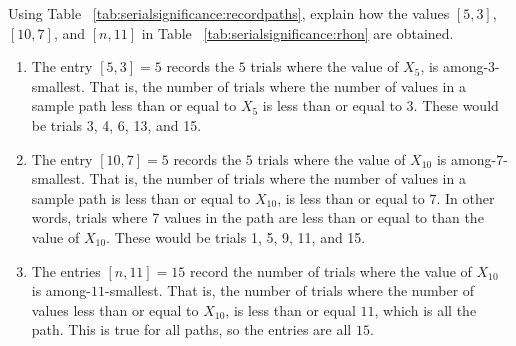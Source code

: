 \documentclass[12pt]{article}
\begin{document}
\begin{exercise}
    Using Table~%
    \ref{tab:serialsignificance:recordpaths}, explain how the values \(
    [5,3] \), \( [10, 7] \), and \( [n, 11] \) in  Table~%
    \ref{tab:serialsignificance:rhon}
    are obtained.
\end{exercise}
\begin{solution}
    \begin{enumerate}
        \item
            The entry \( [5,3] = 5 \) records the \( 5 \) trials where
            the value of \( X_5 \), is among-3-smallest.  That is, the
            number of trials where the number of values in a sample path
            less than or equal to \( X_5 \) is less
            than or equal to \( 3 \).  These would be trials 3, 4, 6,
            13, and 15.
        \item
            The entry \( [10, 7] = 5 \) records the \( 5 \) trials
            where the value of \( X_{10} \) is among-\( 7 \)-smallest.
            That is, the number of trials where the number of values
            in a sample path is less than or equal to \(
            X_{10} \), is less than or equal to \( 7 \).  In other words,
            trials where 7 values in the path are less than or
            equal to than the value of \( X_{10} \).  These would be
            trials 1, 5, 9, 11, and 15.
        \item
            The entries \( [n, 11] = 15 \) record the number of trials
            where the value of \( X_{10} \) is among-\( 11 \)-smallest.
            That is, the number of trials where the number of values
            less than or equal to \(   X_{10} \), is less than or equal
            \( 11 \), which is all the
            path.  This is true for all paths, so the
            entries are all \( 15 \).
    \end{enumerate}
\end{solution}
\end{document}
